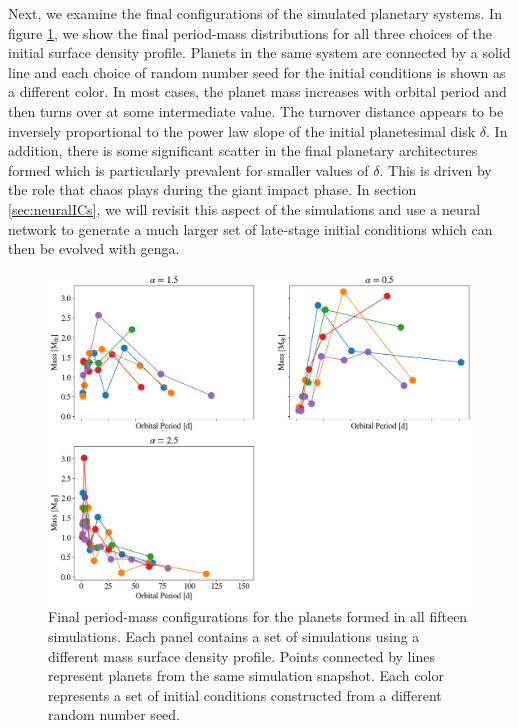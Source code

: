 Next, we examine the final configurations of the simulated planetary systems. In figure \ref{fig:per_mass_full}, we show the final period-mass distributions for all three choices of the initial surface density profile. Planets in the same system are connected by a solid line and each choice of random number seed for the initial conditions is shown as a different color. In most cases, the planet mass increases with orbital period and then turns over at some intermediate value. The turnover distance appears to be inversely proportional to the power law slope of the initial planetesimal disk $\delta$. In addition, there is some significant scatter in the final planetary architectures formed which is particularly prevalent for smaller values of $\delta$. This is driven by the role that chaos plays during the giant impact phase. In section \ref{sec:neuralICs}, we will revisit this aspect of the simulations and use a neural network to generate a much larger set of late-stage initial conditions which can then be evolved with {\sc genga}.

\begin{figure}
\begin{center}
    \includegraphics[width=\textwidth]{figures/stip/per_mass_full.png}
    \caption{Final period-mass configurations for the planets formed in all fifteen simulations. Each panel contains a set of simulations using a different mass surface density profile. Points connected by lines represent planets from the same simulation snapshot. Each color represents a set of initial conditions constructed from a different random number seed.\label{fig:per_mass_full}}
\end{center}
\end{figure}

